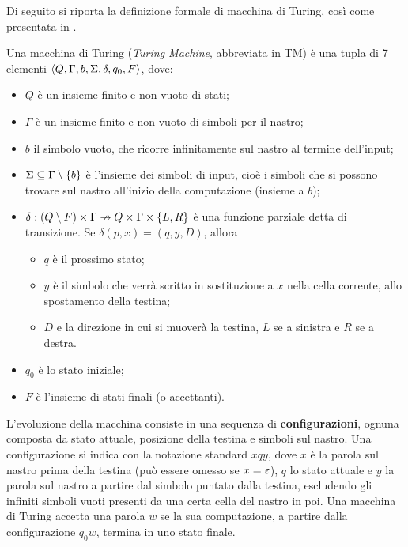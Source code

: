 Di seguito si riporta la definizione formale di macchina di Turing, così come presentata in \cite{hopcroftullman79}.
\begin{defin}
	Una macchina di Turing (\emph{Turing Machine}, abbreviata in TM) è una tupla di 7 elementi $\langle Q,\Gamma,b,\Sigma,\delta,q_0,F \rangle$, dove:
	\begin{itemize}
		\item $Q$ è un insieme finito e non vuoto di stati;
		\item $\Gamma$ è un insieme finito e non vuoto di simboli per il nastro;
		\item $b$ il simbolo vuoto, che ricorre infinitamente sul nastro al termine dell'input;
		\item $\Sigma\subseteq\Gamma\setminus\left\{ b \right\}$ è l'insieme dei simboli di input, cioè i simboli che si possono trovare sul nastro all'inizio della computazione (insieme a $b$);
		\item $\delta:(Q\setminus F)\times\Gamma\nrightarrow Q\times\Gamma\times\left\{ L,R \right\}$ è una funzione parziale detta di transizione. Se $\delta(p,x)=(q,y,D)$, allora
			\begin{itemize}
				\item $q$ è il prossimo stato;
				\item $y$ è il simbolo che verrà scritto in sostituzione a $x$ nella cella corrente, allo spostamento della testina;
				\item $D$ e la direzione in cui si muoverà la testina, $L$ se a sinistra e $R$ se a destra.
			\end{itemize}
		\item $q_0$ è lo stato iniziale;
		\item $F$ è l'insieme di stati finali (o accettanti).
	\end{itemize}
	L'evoluzione della macchina consiste in una sequenza di \textbf{configurazioni}, ognuna composta da stato attuale, posizione della testina e simboli sul nastro. Una configurazione si indica con la notazione standard $xqy$, dove $x$ è la parola sul nastro prima della testina (può essere omesso se $x=\varepsilon$), $q$ lo stato attuale e $y$ la parola sul nastro a partire dal simbolo puntato dalla testina, escludendo gli infiniti simboli vuoti presenti da una certa cella del nastro in poi.
	Una macchina di Turing accetta una parola $w$ se la sua computazione, a partire dalla configurazione $q_0w$, termina in uno stato finale.
\end{defin}


